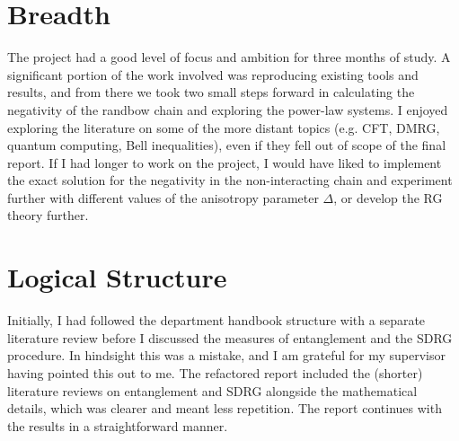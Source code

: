 \documentclass[11pt]{article}
\begin{document}
\section{Breadth}
The project had a good level of focus and ambition for three months of study. A significant portion of the work involved was reproducing existing tools and results, and from there we took two small steps forward in calculating the negativity of the randbow chain and exploring the power-law systems. I enjoyed exploring the literature on some of the more distant topics (e.g. CFT, DMRG, quantum computing, Bell inequalities), even if they fell out of scope of the final report. If I had longer to work on the project, I would have liked to implement the exact solution for the negativity in the non-interacting chain and experiment further with different values of the anisotropy parameter $\Delta$, or develop the RG theory further. 


\section{Logical Structure}
Initially, I had followed the department handbook structure with a separate literature review before I discussed the measures of entanglement and the SDRG procedure. In hindsight this was a mistake, and I am grateful for my supervisor having pointed this out to me. The refactored report included the (shorter) literature reviews on entanglement and SDRG alongside the mathematical details, which was clearer and meant less repetition. The report continues with the results in a straightforward manner.
\end{document}
